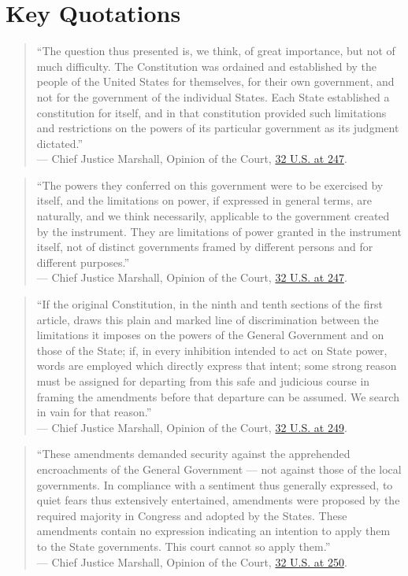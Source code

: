 \documentclass[12pt]{article}
\begin{document}
\section{Key Quotations}

\begin{quote}
``The question thus presented is, we think, of great importance, but not of much difficulty. The Constitution was ordained and established by the people of the United States for themselves, for their own government, and not for the government of the individual States. Each State established a constitution for itself, and in that constitution provided such limitations and restrictions on the powers of its particular government as its judgment dictated.''\\
--- Chief Justice Marshall, Opinion of the Court, \href{https://supreme.justia.com/cases/federal/us/32/243/}{32 U.S. at 247}.
\end{quote}

\begin{quote}
``The powers they conferred on this government were to be exercised by itself, and the limitations on power, if expressed in general terms, are naturally, and we think necessarily, applicable to the government created by the instrument. They are limitations of power granted in the instrument itself, not of distinct governments framed by different persons and for different purposes.''\\
--- Chief Justice Marshall, Opinion of the Court, \href{https://supreme.justia.com/cases/federal/us/32/243/}{32 U.S. at 247}.
\end{quote}

\begin{quote}
``If the original Constitution, in the ninth and tenth sections of the first article, draws this plain and marked line of discrimination between the limitations it imposes on the powers of the General Government and on those of the State; if, in every inhibition intended to act on State power, words are employed which directly express that intent; some strong reason must be assigned for departing from this safe and judicious course in framing the amendments before that departure can be assumed. We search in vain for that reason.''\\
--- Chief Justice Marshall, Opinion of the Court, \href{https://supreme.justia.com/cases/federal/us/32/243/}{32 U.S. at 249}.
\end{quote}

\begin{quote}
``These amendments demanded security against the apprehended encroachments of the General Government --- not against those of the local governments. In compliance with a sentiment thus generally expressed, to quiet fears thus extensively entertained, amendments were proposed by the required majority in Congress and adopted by the States. These amendments contain no expression indicating an intention to apply them to the State governments. This court cannot so apply them.''\\
--- Chief Justice Marshall, Opinion of the Court, \href{https://supreme.justia.com/cases/federal/us/32/243/}{32 U.S. at 250}.
\end{quote}
\end{document}
